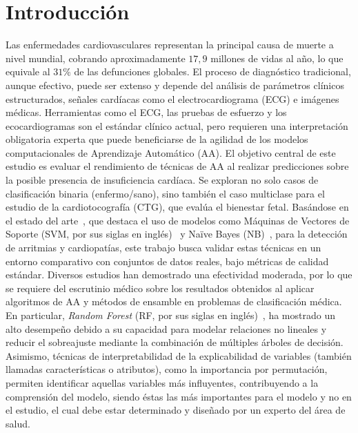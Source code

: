 \documentclass{llncs}
\begin{document}
\vspace{0.5cm}
\setcounter{page}{1}

%
\section{Introducción}

Las enfermedades cardiovasculares representan la principal causa de muerte a nivel mundial, cobrando aproximadamente $17,9$ millones de vidas al año, lo que equivale al $31\%$ de las defunciones globales. El proceso de diagnóstico tradicional, aunque efectivo, puede ser extenso y depende del análisis de parámetros clínicos estructurados, señales cardíacas como el electrocardiograma (ECG) e imágenes médicas. Herramientas como el ECG, las pruebas de esfuerzo y los ecocardiogramas son el estándar clínico actual, pero requieren una interpretación obligatoria experta que puede beneficiarse de la agilidad de los modelos computacionales de Aprendizaje Automático (AA).
El objetivo central de este estudio es evaluar el rendimiento de técnicas de AA al realizar predicciones sobre la posible presencia de insuficiencia cardíaca. Se exploran no solo casos de clasificación binaria (enfermo/sano), sino también el caso multiclase para el estudio de la cardiotocografía (CTG), que evalúa el bienestar fetal. Basándose en el estado del arte~\parencite{isaksen2025evaluating,kumar2021machine}, que destaca el uso de modelos como Máquinas de Vectores de Soporte (SVM, por sus siglas en inglés)~\parencite{Cortes1995} y Naïve Bayes (NB)~\parencite{hand2001idiot}, para la detección de arritmias y cardiopatías, este trabajo busca validar estas técnicas en un entorno comparativo con conjuntos de datos reales, bajo métricas de calidad estándar.
Diversos estudios han demostrado una efectividad moderada, por lo que se requiere del escrutinio médico sobre los resultados obtenidos al aplicar algoritmos de AA y métodos de ensamble en problemas de clasificación médica. En particular, \emph{Random Forest} (RF, por sus siglas en inglés)~\parencite{breiman2017classification}, ha mostrado un alto desempeño debido a su capacidad para modelar relaciones no lineales y reducir el sobreajuste mediante la combinación de múltiples árboles de decisión. Asimismo, técnicas de interpretabilidad de la explicabilidad de variables (también llamadas características o atributos), como la importancia por permutación, permiten identificar aquellas variables más influyentes, contribuyendo a la comprensión del modelo, siendo éstas las más importantes para el modelo y no en el estudio, el cual debe estar determinado y diseñado por un experto del área de salud.
\end{document}
